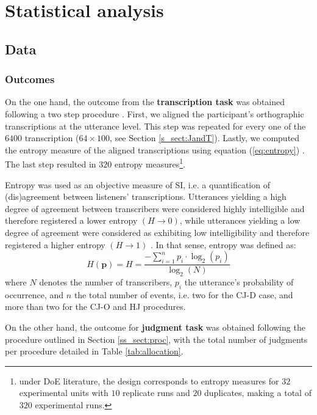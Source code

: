 \section{Statistical analysis}
%
\subsection{Data} \label{s_sect:data}
%
\subsubsection{Outcomes} \label{ss_sect:outcome}
%
On the one hand, the outcome from the \textbf{transcription task} was obtained following a two step procedure \citep{Boonen_et_al_2021}. First, we aligned the participant's orthographic  transcriptions at the utterance level. This step was repeated for every one of the $6400$ transcription ($64 \times 100$, see Section \ref{s_sect:JandT}). Lastly, we computed the entropy measure of the aligned transcriptions using equation (\ref{eq:entropy}) \citep{Shannon_1948}. The last step resulted in $320$ entropy measures\footnote{\label{foot:doe}under DoE literature, the design corresponds to entropy measures for $32$ experimental units with $10$ replicate runs and $20$ duplicates, making a total of $320$ experimental runs.}.

Entropy was used as an objective measure of SI, i.e. a quantification of (dis)agreement between listeners' transcriptions. Utterances yielding a high degree of agreement between transcribers were considered highly intelligible and therefore registered a lower entropy $\left( H \rightarrow 0 \right)$, while utterances yielding a low degree of agreement were considered as exhibiting low intelligibility and therefore registered a higher entropy $\left( H \rightarrow 1 \right)$ \citep{Boonen_et_al_2021, Faes_et_al_2021}. In that sense, entropy was defined as: 
%
\begin{equation} \label{eq:entropy}
	H(\pmb{p}) = H = \frac{-\sum_{i=1}^{n} p_{i} \cdot \log_{2}(p_{i})}{\log_{2}(N)}
\end{equation}
%
where $N$ denotes the number of transcribers, $p_{i}$ the utterance's probability of occurrence, and $n$ the total number of events, i.e. two for the CJ-D case, and more than two for the CJ-O and HJ procedures.

On the other hand, the outcome for \textbf{judgment task} was obtained following the procedure outlined in Section \ref{ss_sect:proc}, with the total number of judgments per procedure detailed in Table \ref{tab:allocation}. 

